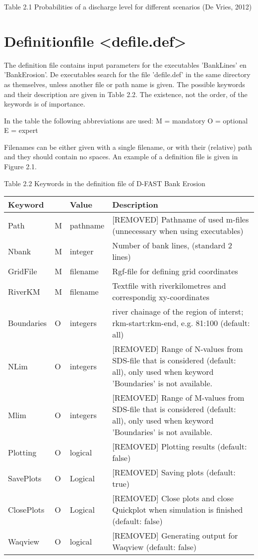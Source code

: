 Table 2.1	Probabilities of a discharge level for different scenarios (De Vries, 2012)

\section{Definitionfile <defile.def>}

The definition file contains input parameters for the executables 'BankLines' en 'BankErosion'.
De executables search for the file 'defile.def' in the same directory as themselves, unless another file or path name is given.
The possible keywords and their description are given in Table 2.2.
The existence, not the order, of the keywords is of importance.

In the table the following abbreviations are used:
M = mandatory
O = optional
E = expert

Filenames can be either given with a single filename, or with their (relative) path and they should contain no spaces.
An example of a definition file is given in Figure 2.1.

Table 2.2  Keywords in the definition file of D-FAST Bank Erosion

\begin{tabular}{llll}
Keyword &  & Value & Description \\ \hline
Path & M & pathname & [REMOVED] Pathname of used m-files (unnecessary when using executables) \\
Nbank & M & integer & Number of bank lines, (standard 2 lines) \\
GridFile  & M & filename & Rgf-file for defining grid coordinates \\
RiverKM & M & filename & Textfile with riverkilometres and correspondig xy-coordinates \\
Boundaries  & O & integers & river chainage of the region of interst;  rkm-start:rkm-end, e.g. 81:100 (default: all) \\
NLim & O & integers & [REMOVED] Range of N-values from SDS-file that is considered (default: all), only used when keyword 'Boundaries' is not available. \\
Mlim & O & integers & [REMOVED] Range of M-values from SDS-file that is considered (default: all), only used when keyword 'Boundaries' is not available. \\
Plotting & O & logical & [REMOVED] Plotting results (default: false) \\
SavePlots & O & Logical & [REMOVED] Saving plots (default: true) \\
ClosePlots & O & Logical & [REMOVED] Close plots and close Quickplot when simulation is finished (default: false) \\
Waqview & O & logical & [REMOVED] Generating output for Waqview (default: false) \hline
\end{tabular}


